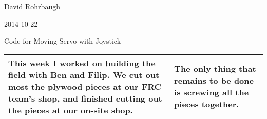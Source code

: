 David Rohrbaugh

2014-10-22

Code for Moving Servo with Joystick

\begin{tabular}{|p{5cm}|p{5cm}|}
 \hline
 This week I worked on building the field with Ben and Filip. We cut out most the plywood pieces at our FRC team's shop, and finished cutting out the pieces at our on-site shop.
 &
 The only thing that remains to be done is screwing all the pieces together.
 \\
 \hline
\end{tabular}
